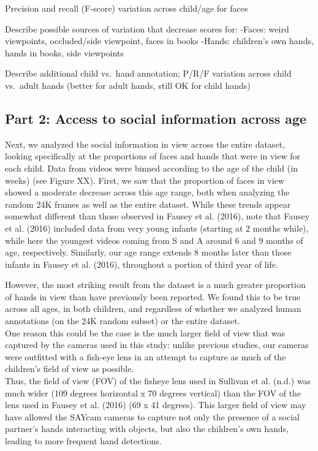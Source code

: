 \documentclass[10pt, letterpaper]{article}
\begin{document}
Precision and recall (F-score) variation across child/age for faces

Describe possible sources of variation that decrease scores for: -Faces:
weird viewpoints, occluded/side viewpoint, faces in books -Hands:
children's own hands, hands in books, side viewpoints

Describe additional child vs.~hand annotation; P/R/F variation across
child vs.~adult hands (better for adult hands, still OK for child hands)

\hypertarget{part-2-access-to-social-information-across-age}{%
\subsection{Part 2: Access to social information across
age}\label{part-2-access-to-social-information-across-age}}

Next, we analyzed the social information in view across the entire
dataset, looking specifically at the proportions of faces and hands that
were in view for each child. Data from videos were binned according to
the age of the child (in weeks) (see Figure XX). First, we saw that the
proportion of faces in view showed a moderate decrease across this age
range, both when analyzing the random 24K frames as well as the entire
dataset. While these trends appear somewhat different than those
observed in Fausey et al. (2016), note that Fausey et al. (2016)
included data from very young infants (starting at 2 months while),
while here the youngest videos coming from S and A around 6 and 9 months
of age, respectively. Similarly, our age range extends 8 months later
than those infants in Fausey et al. (2016), throughout a portion of
third year of life.

However, the most striking result from the dataset is a much greater
proportion of hands in view than have previously been reported. We found
this to be true across all ages, in both children, and regardless of
whether we analyzed human annotations (on the 24K random subset) or the
entire dataset.\\
One reason this could be the case is the much larger field of view that
was captured by the cameras used in this study: unlike previous studies,
our cameras were outfitted with a fish-eye lens in an attempt to capture
as much of the children's field of view as possible.\\
Thus, the field of view (FOV) of the fisheye lens used in Sullivan et
al. (n.d.) was much wider (109 degrees horizontal x 70 degrees vertical)
than the FOV of the lens used in Fausey et al. (2016) (69 x 41 degrees).
This larger field of view may have allowed the SAYcam cameras to capture
not only the presence of a social partner's hands interacting with
objects, but also the children's own hands, leading to more frequent
hand detections.
\end{document}
